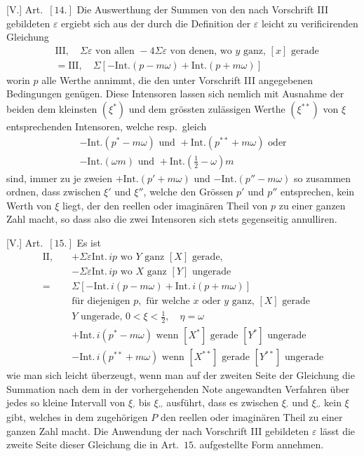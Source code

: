 [V.] Art.\ $[14.]$ Die Auswerthung der Summen von den nach Vorschrift III gebildeten $\varepsilon$ ergiebt sich aus der durch die Definition der $\varepsilon$ leicht zu verificirenden Gleichung
\[
\begin{aligned}
&\mathrm{III},\quad\Sigma\varepsilon\text{ von allen }-4\Sigma\varepsilon\text{ von denen, wo }y\text{ ganz, }[x]\text{ gerade}\\
&=\mathrm{III},\quad\Sigma[-\mathrm{Int.}(p-m\omega)+\mathrm{Int.}(p+m\omega)]
\end{aligned}
\]
worin $p$ alle Werthe annimmt, die den unter Vorschrift III angegebenen Bedingungen genügen. Diese Intensoren lassen sich nemlich mit Ausnahme der beiden dem kleinsten $(\xi^{*})$ und dem grössten zulässigen Werthe $(\xi^{**})$ von $\xi$ entsprechenden Intensoren, welche resp.\ gleich
\[
\begin{gathered}
-\mathrm{Int.}(p^{*}-m\omega)\text{ und }+\mathrm{Int.}(p^{**}+m\omega)\text{ oder}\\
-\mathrm{Int.}(\omega m)\text{ und }+\mathrm{Int.}(\tfrac12-\omega)m
\end{gathered}
\]
sind, immer zu je zweien $+\mathrm{Int.}(p'+m\omega)$ und $-\mathrm{Int.}(p''-m\omega)$ so zusammen ordnen, dass zwischen $\xi'$ und $\xi''$, welche den Grössen $p'$ und $p''$ entsprechen, kein Werth von $\xi$ liegt, der den reellen oder imaginären Theil von $p$ zu einer ganzen Zahl macht, so dass also die zwei Intensoren sich stets gegenseitig annulliren.

%
[V.] Art.\ $[15.]$ Es ist
\[
\begin{aligned}
\mathrm{II},\quad&+\Sigma\varepsilon\mathrm{Int.}\,ip\text{ wo }Y\text{ ganz }[X]\text{ gerade},\\
&-\Sigma\varepsilon\mathrm{Int.}\,ip\text{ wo }X\text{ ganz }[Y]\text{ ungerade}\\
={}&\Sigma[-\mathrm{Int.}\,i(p-m\omega)+\mathrm{Int.}\,i(p+m\omega)]\\
&\text{für diejenigen }p,\text{ für welche }x\text{ oder }y\text{ ganz, }[X]\text{ gerade}\\
&Y\text{ ungerade, }0<\xi<\tfrac12,\quad\eta=\omega\\
&+\mathrm{Int.}\,i(p^{*}-m\omega)\text{ wenn }[X^{*}]\text{ gerade }[Y^{*}]\text{ ungerade}\\
&-\mathrm{Int.}\,i(p^{**}+m\omega)\text{ wenn }[X^{**}]\text{ gerade }[Y^{**}]\text{ ungerade}
\end{aligned}
\]
wie man sich leicht überzeugt, wenn man auf der zweiten Seite der Gleichung die Summation nach dem in der vorhergehenden Note angewandten Verfahren über jedes so kleine Intervall von $\xi_{\prime}$ bis $\xi_{\prime\prime}$ ausführt, dass es zwischen $\xi_{\prime}$ und $\xi_{\prime\prime}$ kein $\xi$ gibt, welches in dem zugehörigen $P$ den reellen oder imaginären Theil zu einer ganzen Zahl macht. Die Anwendung der nach Vorschrift III gebildeten $\varepsilon$ lässt die zweite Seite dieser Gleichung die in Art.\ $15$. aufgestellte Form annehmen.

